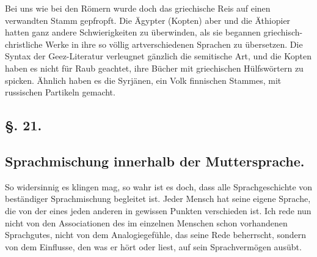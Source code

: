 {Bei uns wie bei den Römern wurde doch das griechische Reis auf einen verwandten Stamm gepfropft. Die Ägypter (Kopten) aber und die Äthiopier hatten ganz andere Schwierigkeiten zu überwinden, als sie begannen griechisch-christliche Werke in ihre so völlig artverschiedenen Sprachen zu übersetzen. Die Syntax der Ge{\ain}ez-Literatur verleugnet gänzlich die semitische Art, und die Kopten haben es nicht für Raub geachtet, ihre Bücher mit griechischen Hülfs\-\label{sp.273}wört\-ern zu spicken. Ähnlich haben es die Syrjänen, ein Volk finnischen Stammes, mit russischen Partikeln gemacht. 

\label{fp.267}

\subsection*{§. 21.}\label{III.II.II.21}
\subsection*{Sprachmischung innerhalb der Muttersprache.}
So widersinnig es klingen mag, so wahr ist es doch, dass alle Sprachgeschichte von beständiger Sprachmischung begleitet ist. Jeder Mensch hat seine eigene Sprache, die von der eines jeden anderen in gewissen Punkten verschieden ist. Ich rede nun nicht von den Associationen des im einzelnen Menschen schon vorhandenen Sprachgutes, nicht von dem Analogiegefühle, das seine Rede beherrscht, sondern von dem Einflusse, den  was er hört oder liest, auf sein Sprachvermögen ausübt.

}
